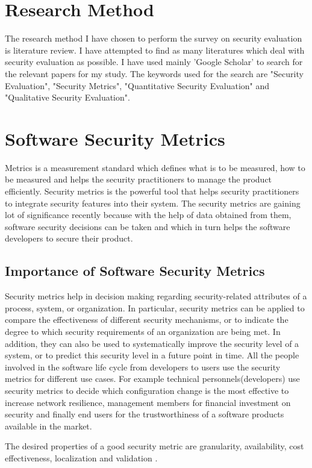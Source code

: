 \documentclass[pdftex,english,oribibl]{llncs}
\begin{document}
\section{Research Method}
The research method I have chosen to perform the survey on security evaluation is literature review. I have attempted to find as many literatures which deal with security evaluation as possible. I have used mainly 'Google Scholar' to search for the relevant papers for my study. The keywords used for the search are  "Security Evaluation", "Security Metrics", "Quantitative Security Evaluation" and  "Qualitative Security Evaluation".


\section{Software Security Metrics}\label{sec:softwaremetrics}
Metrics is a measurement standard which defines what is to be measured, how to be measured and helps the security practitioners to manage the product efficiently. Security metrics is the powerful tool that helps security practitioners to integrate security features into their system. The security metrics are gaining lot of significance recently because with the help of data obtained from them, software security decisions can be taken and which in turn helps the software developers to secure their product. 

\subsection{Importance of Software Security Metrics}
Security metrics help in decision making regarding security-related attributes of a process, system, or organization. In particular, security metrics can be applied to compare the effectiveness of different security mechanisms, or to indicate the degree to which security requirements of an organization are being met. In addition, they can also be used to systematically improve the security level of a system, or to predict this security level in a future point in time. All the people involved in the software life cycle from developers to users use the security metrics for different use cases. For example technical personnels(developers) use security metrics to decide which configuration change is the most effective to increase network resilience, management members for financial investment on security and finally end users for the trustworthiness of a software products available in the market.

The desired properties of a good security metric are granularity, availability, cost effectiveness, localization and validation \cite{8017389_Ramos}. 
\end{document}
